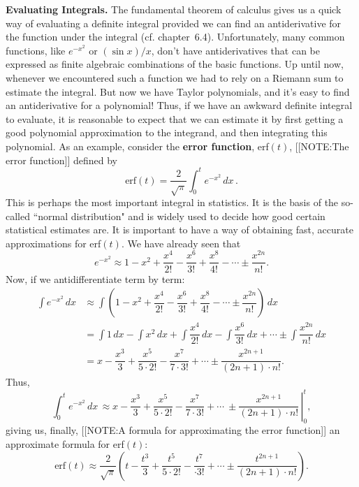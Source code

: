 {\bf Evaluating Integrals.} The fundamental theorem of
calculus gives us a quick way of evaluating a definite integral provided
we can find an antiderivative for the function under the integral (cf.
chapter~6.4).  Unfortunately, many common functions, like $e^{-x^2}$
or $(\sin{x} )/x$, don't have antiderivatives that can be expressed as
finite algebraic combinations of the basic functions.  Up until now,
whenever we encountered such a function we had to rely on a Riemann sum
to estimate the integral.  But now we have Taylor polynomials, and it's
easy to find an antiderivative for a polynomial!  Thus, if we have an
awkward definite integral to evaluate, it is reasonable to expect that
we can estimate it by first getting a good polynomial approximation to
the integrand, and then integrating this polynomial.  As an example,
consider the {\bf error function}, erf$(t)$,
[[NOTE:The error function]] defined by
\[
\mbox{erf$(t)$} = \dfrac{2}{\sqrt{\pi}}\int_0^t e^{-x^2} \, dx\, .
\]
This is perhaps the most important integral in statistics.  It is the
basis of the so-called ``normal distribution" and is widely used to
decide how good certain statistical estimates are.  It is important to
have a way of obtaining fast, accurate approximations for erf$(t)$.
We have already seen that
        \[
e^{-x^2} \approx 1 - x^2 + \dfrac{x^4}{2!} - 
                \dfrac{x^6}{3!} + \dfrac{x^8}{4!} - \cdots 
               \pm \dfrac{x^{2n}}{n!}.
\]
Now, if we antidifferentiate term by term:
\begin{align*}
\int e^{-x^2}\, dx 
  &\approx \int \left( 1 - x^2 + \dfrac{x^4}{2!} - \dfrac{x^6}{3!} 
     + \dfrac{x^8}{4!} - \cdots \pm \dfrac{x^{2n}}{n!}\right) \, dx \\[3pt]
  &= \int 1 \, dx - \int x^2 \, dx + \int \dfrac{x^4}{2!} \, dx 
     - \int \dfrac{x^6}{3!} \, dx + \cdots  
     \pm \int \dfrac{x^{2n}}{n!} \, dx\\[3pt]
  &= x - \dfrac{x^3}{3} + \dfrac{x^5}{5 \cdot 2!} - \dfrac{x^7}{7 \cdot 3!} 
     + \cdots \pm \dfrac{x^{2n+1}}{(2n+1)\cdot n!}.
\end{align*}
Thus,
        \[
\int_0^t e^{-x^2} \, dx\, \approx \left.
                x - \dfrac{x^3}{3} + \dfrac{x^5}{5 \cdot 2!} -
                \dfrac{x^7}{7 \cdot 3!} + \cdots\ 
                \pm \dfrac{x^{2n+1}}{(2n+1) \cdot n!}\, \right|_0^t,
\]
giving us, finally, 
[[NOTE:A formula for approximating the  error function]]
an approximate formula for erf$(t)$:
\[
\mbox{erf$(t)$} \approx \dfrac{2}{\sqrt{\pi}} 
     \left(t - \dfrac{t^3}{3} + \dfrac{t^5}{5 \cdot 2!} -
     \dfrac{t^7}{\cdot 3!} + \cdots \pm \dfrac{t^{2n+1}}{(2n+1) \cdot n!}
      \right).
\]
